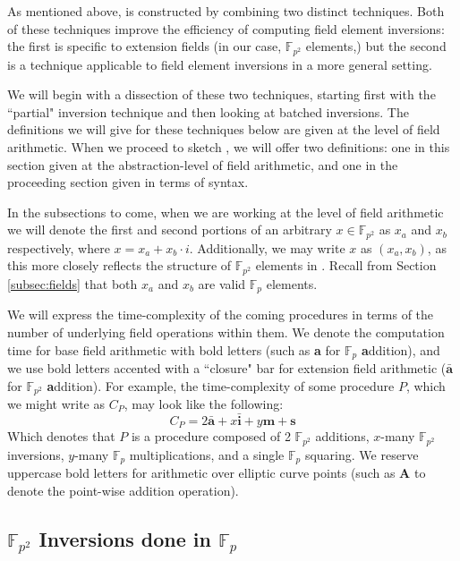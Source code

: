 As mentioned above,  is constructed by combining two distinct techniques. Both of these techniques improve the efficiency of computing field element inversions: the first is specific to extension fields (in our case, $\mathbb{F}_{p^{2}}$ elements,) but the second is a technique applicable to field element inversions in a more general setting.

We will begin with a dissection of these two techniques, starting first with the ``partial" inversion technique and then looking at batched inversions. The definitions we will give for these techniques below are given at the level of field arithmetic. When we proceed to sketch , we will offer two definitions: one in this section given at the abstraction-level of field arithmetic, and one in the proceeding section given in terms of \sidh syntax.

In the subsections to come, when we are working at the level of field arithmetic we will denote the first and second portions of an arbitrary $x \in \mathbb{F}_{p^{2}}$ as $x_{a}$ and $x_{b}$ respectively, where $x = x_{a} + x_{b}\cdot i$. Additionally, we may write $x$ as $(x_{a}, x_{b})$, as this more closely reflects the structure of $\mathbb{F}_{p^{2}}$ elements in \sidh. Recall from Section \ref{subsec:fields} that both $x_{a}$ and $x_{b}$ are valid $\mathbb{F}_{p}$ elements.

We will express the time-complexity of the coming procedures in terms of the number of underlying field operations within them. We denote the computation time for base field arithmetic with bold letters (such as \textbf{a} for $\mathbb{F}_p$ \textbf{a}ddition), and we use bold letters accented with a ``closure" bar for extension field arithmetic ($\bar{\textbf{a}}$ for $\mathbb{F}_{p^2}$ \textbf{a}ddition). For example, the time-complexity of some procedure $P$, which we might write as $C_{P}$, may look like the following:
$$
C_{P} = 2\bar{\textbf{a}} + x\bar{\textbf{i}} + y\textbf{m} + \textbf{s}
$$
Which denotes that $P$ is a procedure composed of 2 $\mathbb{F}_{p^{2}}$ additions, $x$-many $\mathbb{F}_{p^{2}}$ inversions, $y$-many $\mathbb{F}_{p}$ multiplications, and a single $\mathbb{F}_{p}$ squaring. We reserve uppercase bold letters for arithmetic over elliptic curve points (such as \textbf{A} to denote the point-wise addition operation).

\subsection{$\mathbb{F}_{p^{2}}$ Inversions done in $\mathbb{F}_{p}$}
\label{subsec:partialinv}

